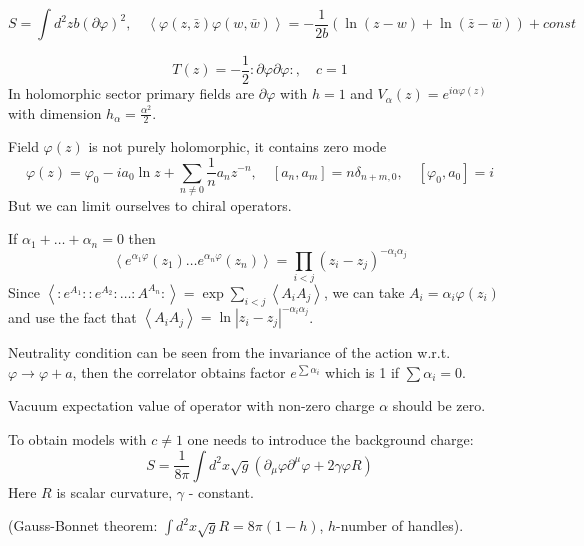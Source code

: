 \documentclass[12pt]{article}
\begin{document}
\begin{equation}
  \label{eq:40}
  S=\int d^{2}z b (\partial \varphi)^{2},\quad \left<\varphi(z,\bar z)\varphi(w,\bar
    w)\right>=-\frac{1}{2b}\left(\ln (z-w) + \ln (\bar z - \bar w)\right)+const
\end{equation}

\begin{equation}
  \label{eq:42}
  T(z)=-\frac{1}{2}:\partial \varphi \partial \varphi:, \quad c=1
\end{equation}
In holomorphic sector primary fields are $\partial \varphi$ with $h=1$ and
$V_{\alpha}(z)=e^{i \alpha \varphi(z)}$ with dimension $h_{\alpha}=\frac{\alpha^{2}}{2}$.

Field $\varphi(z)$ is not purely holomorphic, it contains zero mode
\begin{equation}
  \label{eq:43}
  \varphi(z)=\varphi_{0}-ia_{0}\ln z+\sum_{n\neq 0}\frac{1}{n}a_{n} z^{-n},\quad
  [a_{n},a_{m}]=n\delta_{n+m,0}, \quad [\varphi_{0},a_{0}]=i
\end{equation}
But we can limit ourselves to chiral operators.

If $\alpha_{1}+\dots+\alpha_{n}=0$ then 
\begin{equation}
  \label{eq:41}
  \left<e^{\alpha_{1}\varphi}(z_{1})\dots e^{\alpha_{n}\varphi}(z_{n})\right> = \prod_{i<j}(z_{i}-z_{j})^{-\alpha_{i}\alpha_{j}}
\end{equation}
Since $\left< :e^{A_{1}}::e^{A_{2}}:\dots :A^{A_{n}}:\right> =
\exp\sum_{i<j}\left<A_{i}A_{j}\right>$, we can take $A_{i}=\alpha_{i}\varphi(z_{i})$ and use the
fact that $\left<A_{i}A_{j}\right>=\ln |z_{i}-z_{j}|^{-\alpha_{i}\alpha_{j}}$. 

Neutrality condition can be seen from the invariance of the action w.r.t. $\varphi\to\varphi+a$,
then the correlator obtains factor $e^{\sum \alpha_{i}}$ which is 1 if $\sum \alpha_{i}=0$.

Vacuum expectation value of operator with non-zero charge $\alpha$ should be zero. 

To obtain models with $c\neq 1$ one needs to introduce the background charge:
\begin{equation}
  \label{eq:44}
  S=\frac{1}{8\pi} \int d^{2}x \sqrt{g} (\partial_{\mu}\varphi\partial^{\mu}\varphi+2\gamma\varphi R)
\end{equation}
Here $R$ is scalar curvature, $\gamma$ - constant. 

(Gauss-Bonnet theorem: $\int d^{2}x \sqrt{g} R = 8\pi(1-h)$, $h$-number of handles).
\end{document}
